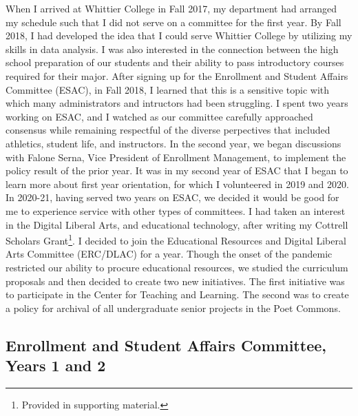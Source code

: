 \documentclass[../../../main.tex]{subfiles}
\begin{document}
\label{sec:committee_service}

When I arrived at Whittier College in Fall 2017, my department had arranged my schedule such that I did not serve on a committee for the first year.  By Fall 2018, I had developed the idea that I could serve Whittier College by utilizing my skills in data analysis.  I was also interested in the connection between the high school preparation of our students and their ability to pass introductory courses required for their major.  After signing up for the Enrollment and Student Affairs Committee (ESAC), in Fall 2018, I learned that this is a sensitive topic with which many administrators and intructors had been struggling.  I spent two years working on ESAC, and I watched as our committee carefully approached consensus while remaining respectful of the diverse perpectives that included athletics, student life, and instructors.  In the second year, we began discussions with Falone Serna, Vice President of Enrollment Management, to implement the policy result of the prior year.  It was in my second year of ESAC that I began to learn more about first year orientation, for which I volunteered in 2019 and 2020.
\\
\vspace{0.25cm}
In 2020-21, having served two years on ESAC, we decided it would be good for me to experience service with other types of committees.  I had taken an interest in the Digital Liberal Arts, and educational technology, after writing my Cottrell Scholars Grant\footnote{Provided in supporting material.}.  I decided to join the Educational Resources and Digital Liberal Arts Committee (ERC/DLAC) for a year.  Though the onset of the pandemic restricted our ability to procure educational resources, we studied the curriculum proposals and then decided to create two new initiatives.  The first initiative was to participate in the Center for Teaching and Learning.  The second was to create a policy for archival of all undergraduate senior projects in the Poet Commons.

\subsection{Enrollment and Student Affairs Committee, Years 1 and 2}
\end{document}
